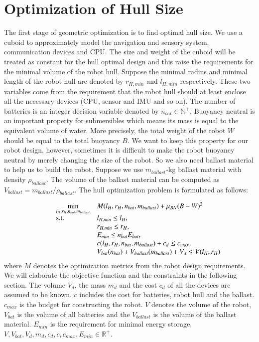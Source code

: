 \section{Optimization of Hull Size}
The first stage of geometric optimization is to find optimal hull size.
We use a cuboid to approximately model the navigation and sensory system, communication devices and CPU. The size and weight of the cuboid will be treated as constant for the hull optimal design and this raise the requirements for the minimal volume of the robot hull. Suppose the minimal radius and minimal length of the robot hull are denoted by $r_{H,min}$ and $l_{H,min}$ respectively. These two variables come from the requirement that the robot hull should at least enclose all the necessary devices (CPU, sensor and IMU and so on). The number of batteries is an integer decision variable denoted by $n_{bat}\in \mathbb{N}^{+}$. Buoyancy neutral is an important property for submersibles which means its mass is equal to the equivalent volume of water. More precisely, the total weight of the robot $W$ should be equal to the total buoyancy $B$. We want to keep this property for our robot design, however, sometimes it is difficult to make the robot buoyancy neutral by merely changing the size of the robot. So we also need ballast material to help us to build the robot. Suppose we use $m_{ballast}$-kg ballast material with density $\rho_{ballast}$. The volume of the ballast material can be computed as $V_{ballast}=m_{ballast}/ \rho_{ballast}$. The hull optimization problem is formulated as follows: 

\begin{equation}
\begin{array}{llllll}
\displaystyle \min_{l_{H},r_{H},n_{bat},m_{ballast}} & \multicolumn{3}{l}{M(l_{H},r_{H},n_{bat},m_{ballast})+\mu_{BN}(B-W)^{2}} \\
\textrm{s.t.} & l_{H,min} \leq l_{H}, \\
&r_{H,min} \leq r_{H}, \\
&E_{min} \leq n_{bat}E_{bat},\\
&c(l_{H},r_{H},n_{bat},m_{ballast})+c_{d} \leq c_{max},\\
&V_{bat}(n_{bat})+V_{ballast}(m_{ballast})+V_{d} \leq V(l_{H},r_{H})
\end{array}
\end{equation}
where $M$ denotes the optimization metrics from the robot design requirements. We will elaborate the objective function and the constraints 
in the following section. The volume $V_{d}$, the mass $m_{d}$ and the cost $c_{d}$ of all the devices are assumed to be known. $c$ includes the cost for batteries, robot hull and the ballast. $c_{max}$ is the budget for constructing the robot. $V$ denotes the volume of the robot, $V_{bat}$ is the volume of all batteries and the $V_{ballast}$ is the volume of the ballast material. $E_{min}$ is the requirement for minimal energy storage, $V,V_{bat},V_{d},m_{d},c_{d},c,c_{max},E_{min}\in \mathbb{R}^{+}$.    
